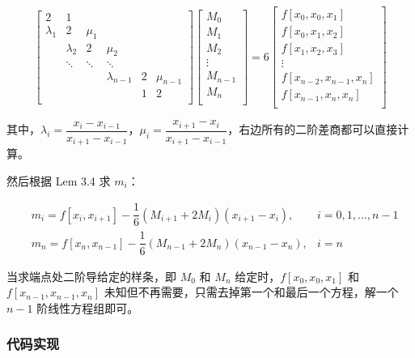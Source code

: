 \documentclass{ctexart}
\begin{document}
\begin{equation}
\begin{bmatrix}
2 & 1 & & & & \\
\lambda_1 & 2 & \mu_1 & & & \\
& \lambda_2 & 2 & \mu_2 & \\
& \ddots & \ddots & \ddots & \\
& & & \lambda_{n-1} & 2 & \mu_{n-1} \\
& & & & 1 & 2\\
\end{bmatrix}
\begin{bmatrix}
M_0\\
M_1\\
M_2\\
\vdots\\
M_{n-1}\\
M_n\\
\end{bmatrix}
=
6\begin{bmatrix}
f[x_0,x_0,x_1]\\
f[x_0,x_1,x_2]\\
f[x_1,x_2,x_3]\\
\vdots\\
f[x_{n-2},x_{n-1},x_n]\\
f[x_{n-1},x_n,x_n]\\
\end{bmatrix}
\end{equation}

其中，$\lambda_i=\dfrac{x_i-x_{i-1}}{x_{i+1}-x_{i-1}}$，$\mu_i=\dfrac{x_{i+1}-x_i}{x_{i+1}-x_{i-1}}$，右边所有的二阶差商都可以直接计算。

然后根据 Lem 3.4 求 $m_i$：

\begin{equation}
\begin{aligned}
    & m_i=f[x_i,x_{i+1}]-\dfrac 16 (M_{i+1}+2M_i)(x_{i+1}-x_i), & i=0,1,\dots,n-1\\
    & m_n=f[x_n,x_{n-1}]-\dfrac 16 (M_{n-1}+2M_n)(x_{n-1}-x_n), & i=n
\end{aligned}
\end{equation}

当求端点处二阶导给定的样条，即 $M_0$ 和 $M_n$ 给定时，$f[x_0,x_0,x_1]$ 和 $f[x_{n-1},x_{n-1},x_n]$ 未知但不再需要，只需去掉第一个和最后一个方程，解一个 $n-1$ 阶线性方程组即可。

\subsubsection{代码实现}
\end{document}
